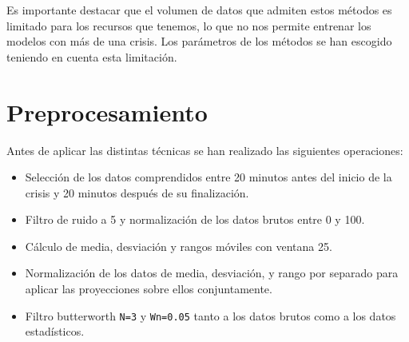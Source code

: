 \documentclass[a4paper,12pt,twoside,oldfontcommands]{memoir}
\begin{document}
Es importante destacar que el volumen de datos que admiten estos métodos es limitado para los recursos que tenemos, lo que no nos permite entrenar los modelos con más de una crisis. Los parámetros de los métodos se han escogido teniendo en cuenta esta limitación. 
\section{Preprocesamiento}
Antes de aplicar las distintas técnicas se han realizado las siguientes operaciones: 
\begin{itemize}
    \item Selección de los datos comprendidos entre 20 minutos antes del inicio de la crisis y 20 minutos después de su finalización. 
    \item Filtro de ruido a 5 y normalización de los datos brutos entre 0 y 100.
    \item Cálculo de media, desviación y rangos móviles con ventana 25. 
    \item Normalización de los datos de media, desviación, y rango por separado para aplicar las proyecciones sobre ellos conjuntamente. 
    \item Filtro butterworth \texttt{N=3} y \texttt{Wn=0.05} tanto a los datos brutos como a los datos estadísticos.  
\end{itemize}
\end{document}
